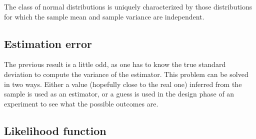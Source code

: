     \begin{property}
        The class of normal distributions is uniquely characterized by those distributions for which the sample mean and sample variance are independent.
    \end{property}

\subsection{Estimation error}

    \begin{remark}
        The previous result is a little odd, as one has to know the true standard deviation to compute the variance of the estimator. This problem can be solved in two ways. Either a value (hopefully close to the real one) inferred from the sample is used as an estimator, or a guess is used in the design phase of an experiment to see what the possible outcomes are.
    \end{remark}

\subsection{Likelihood function}


